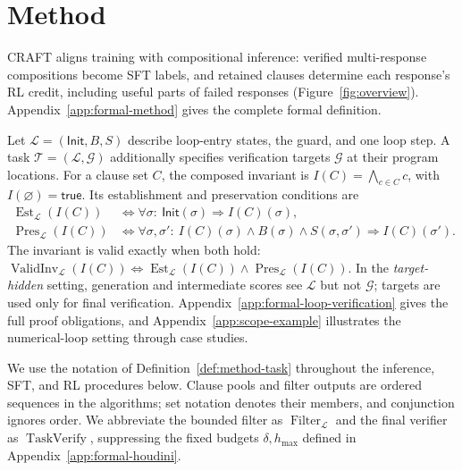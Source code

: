 \section{Method}\label{sec:method}

CRAFT aligns training with compositional inference: verified multi-response
compositions become SFT labels, and retained clauses determine each response's
RL credit, including useful parts of failed responses (Figure~\ref{fig:overview}).
Appendix~\ref{app:formal-method} gives the complete formal definition.

\begin{definition}
\label{def:method-task}
Let \(\mathcal L=(\mathsf{Init},B,S)\) describe loop-entry states, the guard,
and one loop step.  A task \(\mathcal T=(\mathcal L,\mathcal G)\) additionally
specifies verification targets \(\mathcal G\) at their program locations.
For a clause set \(C\), the composed invariant is
\(I(C)=\bigwedge_{c\in C}c\), with \(I(\varnothing)=\mathsf{true}\).
Its establishment and preservation conditions are
\begin{align*}
\operatorname{Est}_{\mathcal L}(I(C))
  &\iff \forall\sigma:\ \mathsf{Init}(\sigma)\Rightarrow I(C)(\sigma),\\
\operatorname{Pres}_{\mathcal L}(I(C))
  &\iff \forall\sigma,\sigma':\
  I(C)(\sigma)\land B(\sigma)\land S(\sigma,\sigma')
  \Rightarrow I(C)(\sigma').
\end{align*}
The invariant is valid exactly when both hold:
\(\operatorname{ValidInv}_{\mathcal L}(I(C))\iff
\operatorname{Est}_{\mathcal L}(I(C))\land
\operatorname{Pres}_{\mathcal L}(I(C))\).
In the \emph{target-hidden} setting, generation and intermediate scores see
\(\mathcal L\) but not \(\mathcal G\); targets are used only for final
verification.  Appendix~\ref{app:formal-loop-verification} gives the full
proof obligations, and Appendix~\ref{app:scope-example} illustrates the
numerical-loop setting through case studies.
\end{definition}

We use the notation of Definition~\ref{def:method-task} throughout the
inference, SFT, and RL procedures below.
Clause pools and filter outputs are ordered sequences in the algorithms;
set notation denotes their members, and conjunction ignores order.
We abbreviate the bounded filter as \(\operatorname{Filter}_{\mathcal L}\)
and the final verifier as \(\operatorname{TaskVerify}\), suppressing the
fixed budgets \(\delta,h_{\max}\) defined in Appendix~\ref{app:formal-houdini}.

